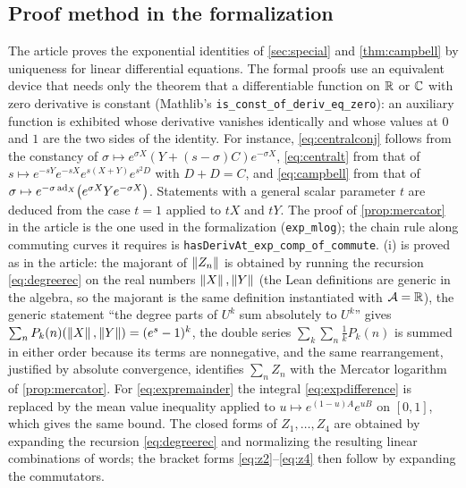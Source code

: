 \subsection*{Proof method in the formalization}
The article proves the exponential identities of \cref{sec:special} and
\cref{thm:campbell} by uniqueness for linear differential equations. The
formal proofs use an equivalent device that needs only the theorem that a
differentiable function on $\mathbb{R}$ or $\mathbb{C}$ with zero derivative is constant
(Mathlib's \texttt{is\_const\_of\_deriv\_eq\_zero}): an auxiliary
function is exhibited whose derivative vanishes identically and whose
values at $0$ and $1$ are the two sides of the identity. For instance,
\eqref{eq:centralconj} follows from the constancy of
$\sigma\mapsto e^{\sigma X}(Y+(s-\sigma)C)e^{-\sigma X}$,
\eqref{eq:centralt} from that of
$s\mapsto e^{-sY}e^{-sX}e^{s(X+Y)}e^{s^2D}$ with $D+D=C$,
and \eqref{eq:campbell} from that of
$\sigma\mapsto e^{-\sigma\operatorname{ad}_X}\bigl(e^{\sigma X}Ye^{-\sigma X}\bigr)$.
Statements with a general scalar parameter $t$ are deduced from the case
$t=1$ applied to $tX$ and $tY$. The proof of \cref{prop:mercator} in the
article is the one used in the formalization (\texttt{exp\_mlog}); the
chain rule along commuting curves it requires is
\texttt{hasDerivAt\_exp\_comp\_of\_commute}. (i) is
proved as in the article: the majorant of $\left\lVert Z_n\right\rVert$ is obtained by running
the recursion \eqref{eq:degreerec} on the real numbers $\left\lVert X\right\rVert,\left\lVert Y\right\rVert$
(the Lean definitions are generic in the algebra, so the majorant is the same
definition instantiated with $\mathcal A=\mathbb{R}$), the generic statement
``the degree parts of $U^k$ sum absolutely to $U^k$'' gives
$\sum_n P_k(n)(\left\lVert X\right\rVert,\left\lVert Y\right\rVert)=(e^{s}-1)^k$, the double series
$\sum_k\sum_n\frac1kP_k(n)$ is summed in either order because its terms are
nonnegative, and the same rearrangement, justified by absolute convergence,
identifies $\sum_nZ_n$ with the Mercator logarithm of \cref{prop:mercator}.
For \eqref{eq:expremainder} the integral \eqref{eq:expdifference} is replaced
by the mean value inequality applied to $u\mapsto e^{(1-u)A}e^{uB}$ on
$[0,1]$, which gives the same bound. The closed forms of $Z_1,\ldots,Z_4$
are obtained by expanding the recursion \eqref{eq:degreerec} and normalizing
the resulting linear combinations of words; the bracket forms
\eqref{eq:z2}--\eqref{eq:z4} then follow by expanding the commutators.

